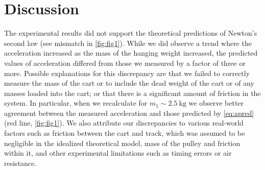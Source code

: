 ﻿\documentclass[reprint,amsmath,amssymb,aps]{revtex4-2}
\begin{document}
\section{Discussion}
The experimental results did not support the theoretical predictions of Newton's second law (see mismatch in \cref{fig:fig1}).  While we did observe a trend where the acceleration increased as the mass of the hanging weight increased, the predicted values of acceleration differed from those we measured by a factor of three or more.  Possible explanations for this discrepancy are that we failed to correctly measure the mass of the cart or to include the dead weight of the cart or of any masses loaded into the cart; or that there is a significant amount of friction in the system. In particular, when we recalculate for $m_1\sim\qty{2.5}{\kilo\gram}$ we observe better agreement between the measured acceleration and those predicted by \cref{eq:apred} (red line, \cref{fig:fig1}). We also attribute our discrepancies to various real-world factors such as friction between the cart and track, which was assumed to be negligible in the idealized theoretical model, mass of the pulley and friction within it, and other experimental limitations such as timing errors or air resistance.

\end{document}
